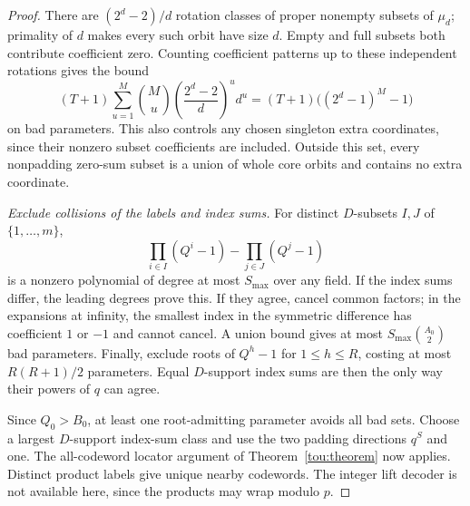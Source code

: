 \begin{proof}
There are $(2^d-2)/d$ rotation classes of proper nonempty subsets of
$\mu_d$; primality of $d$ makes every such orbit have size $d$.
Empty and full subsets both contribute coefficient zero. Counting
coefficient patterns up to these independent rotations gives the bound
\[
 (T+1)\sum_{u=1}^M\binom Mu
      \left(\frac{2^d-2}{d}\right)^u d^u
 =(T+1)\bigl((2^d-1)^M-1\bigr)
\]
on bad parameters. This also controls any chosen singleton extra
coordinates, since their nonzero subset coefficients are included.
Outside this set, every nonpadding zero-sum subset is a union of
whole core orbits and contains no extra coordinate.

\emph{Exclude collisions of the labels and index sums.}
For distinct $D$-subsets $I,J$ of $\{1,\ldots,m\}$,
\[
 \prod_{i\in I}(Q^i-1)-\prod_{j\in J}(Q^j-1)
\]
is a nonzero polynomial of degree at most $S_{\max}$ over any field.
If the index sums differ, the leading degrees prove this. If they
agree, cancel common factors; in the expansions at infinity, the
smallest index in the symmetric difference has coefficient $1$ or
$-1$ and cannot cancel. A union bound gives at most
$S_{\max}\binom{A_0}{2}$ bad parameters.
Finally, exclude roots of $Q^h-1$ for $1\le h\le R$, costing at most
$R(R+1)/2$ parameters. Equal $D$-support index sums are then the only
way their powers of $q$ can agree.

Since $Q_0>B_0$, at least one root-admitting parameter avoids all bad
sets. Choose a largest $D$-support index-sum class and use the two
padding directions $q^S$ and one. The all-codeword locator argument
of Theorem~\ref{tou:theorem} now applies. Distinct product labels give
unique nearby codewords. The integer lift decoder is not available
here, since the products may wrap modulo $p$.
\end{proof}

